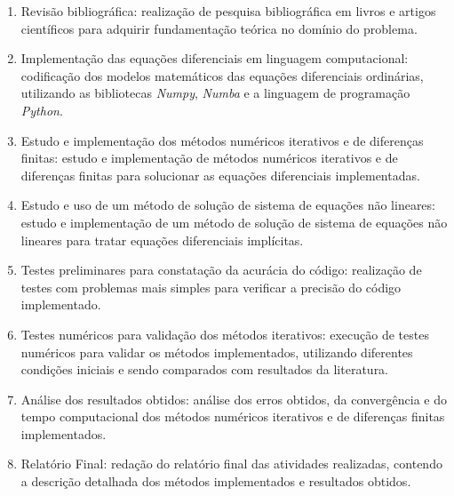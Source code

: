 \begin{enumerate}
	\item Revisão bibliográfica: realização de pesquisa bibliográfica em livros e artigos científicos para adquirir fundamentação teórica no domínio do problema.
	\item Implementação das equações diferenciais em linguagem computacional: codificação dos modelos matemáticos das equações diferenciais ordinárias, utilizando as bibliotecas \emph{Numpy}, \emph{Numba} e a linguagem de programação \emph{Python}.
	\item Estudo e implementação dos métodos numéricos iterativos e de diferenças finitas: estudo e implementação de métodos numéricos iterativos e de diferenças finitas para solucionar as equações diferenciais implementadas.
	\item Estudo e uso de um método de solução de sistema de equações não lineares: estudo e implementação de um método de solução de sistema de equações não lineares para tratar equações diferenciais implícitas.
	\item Testes preliminares para constatação da acurácia do código: realização de testes com problemas mais simples para verificar a precisão do código implementado.
	\item Testes numéricos para validação dos métodos iterativos: execução de testes numéricos para validar os métodos implementados, utilizando diferentes condições iniciais e sendo comparados com resultados da literatura.
	\item Análise dos resultados obtidos: análise dos erros obtidos, da convergência e do tempo computacional dos métodos numéricos iterativos e de diferenças finitas implementados.
	\item Relatório Final: redação do relatório final das atividades realizadas, contendo a descrição detalhada dos métodos implementados e resultados obtidos.
	\end{enumerate}